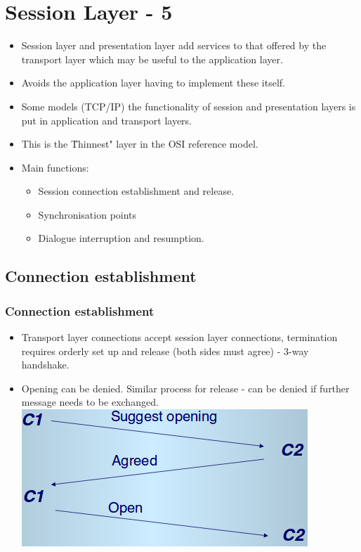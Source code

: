 \documentclass{beamer}
\begin{document}
\section{Session Layer - 5}
\begin{frame}
\begin{itemize}
\frametitle{Descriptions}
\item Session layer and presentation layer add services to that offered by the transport layer which may be useful to the application layer.
\item Avoids the application layer having to implement these itself.
\item Some models (TCP/IP) the functionality of session and presentation layers is put in application and transport layers.
\item This is the \"Thinnest" layer in the OSI reference model.
\item Main functions:
\begin{itemize}
\item Session connection establishment and release.
\item Synchronisation points
\item Dialogue interruption and resumption.
\end{itemize}
\end{itemize}
\end{frame}
\subsection{Connection establishment}
\begin{frame}
\frametitle{Connection establishment}
\begin{itemize}
\item Transport layer connections accept session layer connections, termination requires orderly set up and release (both sides must agree) - 3-way handshake.
\item Opening can be denied. Similar process for release - can be denied if further message needs to be exchanged.
\includegraphics[scale=0.4]{sess.png}
\end{itemize}
\end{frame}
\end{document}
